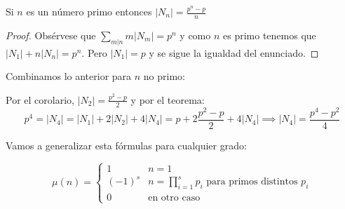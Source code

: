 \begin{corollary}
	Si $n$ es un número primo entonces $|N_n| = \frac{p^n-p}{n}$
\end{corollary}
\begin{proof}
	Obsérvese que $\sum_{m|n} m |N_m| = p^n$ y como $n$ es primo tenemos que $|N_1| + n|N_n| = p^n$. Pero $|N_1| = p$ y se sigue la igualdad del enunciado. 
\end{proof}

Combinamos lo anterior para $n$ no primo:

\begin{example}[Cálculo de $|N_4|$]
Por el corolario, $|N_2| = \frac{p^2 - p}{2}$ y por el teorema: $$p^4 = |N_4| = |N_1| + 2|N_2| + 4 |N_4| = p + 2 \frac{p^2 - p}{2} + 4|N_4| \implies |N_4| = \frac{p^4-p^2}{4}$$
\end{example}

Vamos a generalizar esta fórmulas para cualquier grado:

\begin{definition}
	\[
	\mu(n) = 
	\begin{cases} 
	1 & n = 1 \\
	(-1)^s & n = \prod_{i = 1}^s p_i  \text{ para primos distintos } p_i \\
	0   & \text{en otro caso}
	\end{cases}
	\]
\end{definition}


